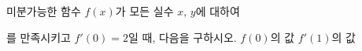 미분가능한 함수 $f(x)$가 모든 실수 $x$, $y$에 대하여\par\smallskip{}\par\smallskip\noindent 를 만족시키고 $f'(0)=2$일 때, 다음을 구하시오.
 $f(0)$의 값
 $f'(1)$의 값
